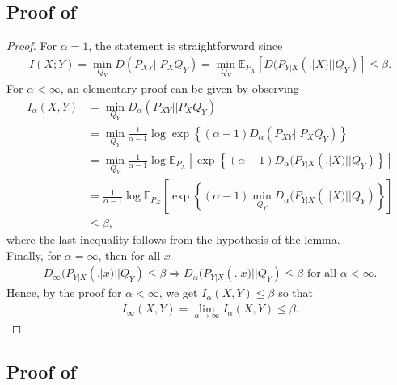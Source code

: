 \documentclass{article}
\numberwithin{theorem}{section}
\numberwithin{example}{section}
\numberwithin{remark}{section}
\numberwithin{definition}{section}
\newcommand{\E}{\mathbb{E}}
\begin{document}
\subsection{Proof of~} \label{app:lem-fano-method}


\begin{proof}
For $\alpha = 1$, the statement is straightforward since
\begin{align}
    I(X;Y) = \min_{Q_Y} D(P_{XY} || P_X Q_Y ) = \min_{Q_Y} \E_{P_X} \left[ D(P_{Y|X}(.|X) || Q_Y) \right] \leq \beta.
\end{align}
For $\alpha < \infty$, an elementary proof can be given by observing
    \begin{align}
        I_\alpha(X,Y) & = \min_{Q_Y} D_\alpha (P_{XY} || P_X Q_Y) \\
        & = \min_{Q_Y} \frac{1}{\alpha-1} \log  \exp \left\lbrace   (\alpha-1)D_\alpha(P_{XY} || P_X Q_Y)  \right\rbrace \\
        & = \min_{Q_Y} \frac{1}{\alpha-1} \log \E_{P_X} \left[  \exp \left\lbrace   (\alpha-1)D_\alpha(P_{Y|X}(.|X) || Q_Y)  \right\rbrace \right] \\
        &  =  \frac{1}{\alpha-1} \log \E_{P_X} \left[  \exp \left\lbrace   (\alpha-1) \min_{Q_Y} D_\alpha(P_{Y|X}(.|X) || Q_Y)  \right\rbrace \right] \\
        & \leq \beta,
    \end{align}
    where the last inequality follows from the hypothesis of the lemma. \\
    Finally, for $\alpha = \infty$, then for all $x$
    \begin{align}
         D_\infty(P_{Y|X}(.|x) || Q_Y) \leq \beta \Rightarrow D_\alpha(P_{Y|X}(.|x) ||  Q_Y) \leq \beta \text{ for all } \alpha < \infty.
    \end{align}
    Hence, by the proof for $\alpha < \infty$, we get $I_\alpha(X,Y) \leq \beta$ so that
    \begin{align}
        I_\infty(X,Y) = \lim_{\alpha \rightarrow \infty} I_\alpha(X,Y) \leq \beta.
    \end{align}
\end{proof}

\subsection{Proof of~} \label{app:genFano}
\end{document}
